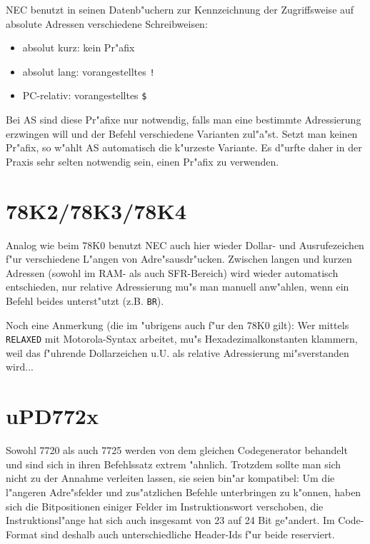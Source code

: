 \documentclass[12pt,a4paper,twoside]{report}
\begin{document}
NEC benutzt in seinen Datenb"uchern zur Kennzeichnung der Zugriffsweise
auf absolute Adressen verschiedene Schreibweisen:
\begin{itemize}
\item{absolut kurz: kein Pr"afix}
\item{absolut lang: vorangestelltes \verb"!"}
\item{PC-relativ: vorangestelltes \verb"$"}
\end{itemize}
Bei AS sind diese Pr"afixe nur notwendig, falls man eine bestimmte
Adressierung erzwingen will und der Befehl verschiedene Varianten
zul"a"st.  Setzt man keinen Pr"afix, so w"ahlt AS automatisch die
k"urzeste Variante.  Es d"urfte daher in der Praxis sehr selten
notwendig sein, einen Pr"afix zu verwenden.


\section{78K2/78K3/78K4}
\label{78K234Spec}

Analog wie beim 78K0 benutzt NEC auch hier wieder Dollar- und
Ausrufezeichen f"ur verschiedene L"angen von Adre"sausdr"ucken.
Zwischen langen und kurzen Adressen (sowohl im RAM- als auch
SFR-Bereich) wird wieder automatisch entschieden, nur relative
Adressierung mu"s man manuell anw"ahlen, wenn ein Befehl beides
unterst"utzt (z.B. {\tt BR}).

Noch eine Anmerkung (die im "ubrigens auch f"ur den 78K0 gilt): Wer
mittels {\tt RELAXED} mit Motorola-Syntax arbeitet, mu"s
Hexadezimalkonstanten klammern, weil das f"uhrende Dollarzeichen u.U. als
relative Adressierung mi"sverstanden wird...


\section{uPD772x}

Sowohl 7720 als auch 7725 werden von dem gleichen Codegenerator behandelt
und sind sich in ihren Befehlssatz extrem "ahnlich.  Trotzdem sollte man
sich nicht zu der Annahme verleiten lassen, sie seien bin"ar kompatibel:
Um die l"angeren Adre"sfelder und zus"atzlichen Befehle unterbringen zu
k"onnen, haben sich die Bitpositionen einiger Felder im Instruktionswort
verschoben, die Instruktionsl"ange hat sich auch insgesamt von 23 auf 24
Bit ge"andert.  Im Code-Format sind deshalb auch unterschiedliche
Header-Ids f"ur beide reserviert.
\end{document}

